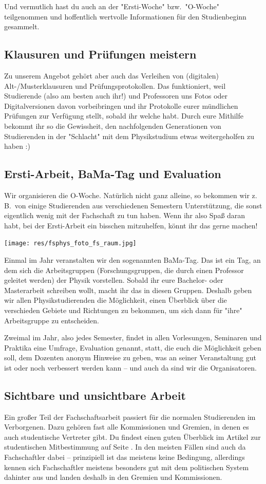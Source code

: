 \begin{multicols}{2}
Und vermutlich hast du auch an der "Ersti-Woche" bzw.\ "O-Woche" teilgenommen und hoffentlich wertvolle Informationen für den Studienbeginn gesammelt.

\subsection*{Klausuren und Prüfungen meistern}
Zu unserem Angebot gehört aber auch das Verleihen von (digitalen) Alt-/Musterklausuren und Prüfungsprotokollen.
Das funktioniert, weil Studierende (also am besten auch ihr!) und Professoren uns Fotos oder Digitalversionen davon vorbeibringen und ihr Protokolle eurer mündlichen Prüfungen zur Verfügung stellt, sobald ihr welche habt.
Durch eure Mithilfe bekommt ihr so die Gewissheit, den nachfolgenden Generationen von Studierenden in der "Schlacht" mit dem Physikstudium etwas weitergeholfen zu haben :)

\subsection*{Ersti-Arbeit, BaMa-Tag und Evaluation}
Wir organisieren die O-Woche.
Natürlich nicht ganz alleine, so bekommen wir z.\,B.\ von einige Studierenden aus verschiedenen Semestern Unterstützung, die sonst eigentlich wenig mit der Fachschaft zu tun haben.
Wenn ihr also Spaß daran habt, bei der Ersti-Arbeit ein bisschen mitzuhelfen, könnt ihr das gerne machen!

\texttt{[image: res/fsphys\_foto\_fs\_raum.jpg]}

Einmal im Jahr veranstalten wir den sogenannten BaMa-Tag.
Das ist ein Tag, an dem sich die Arbeitsgruppen (Forschungsgruppen, die durch einen Professor geleitet werden) der Physik vorstellen.
Sobald ihr eure Bachelor- oder Masterarbeit schreiben wollt, macht ihr das in diesen Gruppen.
Deshalb geben wir allen Physikstudierenden die Möglichkeit, einen Überblick über die verschieden Gebiete und Richtungen zu bekommen, um sich dann für "ihre" Arbeitsgruppe zu entscheiden.

Zweimal im Jahr, also jedes Semester, findet in allen Vorlesungen, Seminaren und Praktika eine Umfrage, Evaluation genannt, statt, die euch die Möglichkeit geben soll, dem Dozenten anonym Hinweise zu geben, was an seiner Veranstaltung gut ist oder noch verbessert werden kann -- und auch da sind wir die Organisatoren.

\subsection*{Sichtbare und unsichtbare Arbeit}
Ein großer Teil der Fachschaftsarbeit passiert für die normalen Studierenden im Verborgenen.
Dazu gehören fast alle Kommissionen und Gremien, in denen es auch studentische Vertreter gibt.
Du findest einen guten Überblick im Artikel zur studentischen Mitbestimmung auf Seite \pageref{studmit}.
In den meisten Fällen sind auch da Fachschaftler dabei -- prinzipiell ist das meistens keine Bedingung, allerdings kennen sich Fachschaftler meistens besonders gut mit dem politischen System dahinter aus und landen deshalb in den Gremien und Kommissionen.


\end{multicols}
